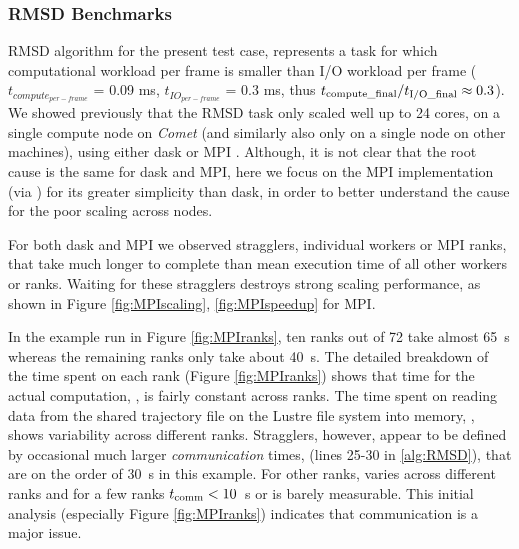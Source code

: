 \label{impl_exp}

\subsubsection{RMSD Benchmarks}
\label{sec:RMSD}
RMSD algorithm for the present test case, represents a task for which computational workload per frame is smaller than I/O workload per frame ($t_{compute_{per-frame}}$ = 0.09 ms, $t_{IO_{per-frame}}$ = 0.3 ms, thus ${t}_{\text{compute\_final}}/{t}_{\text{I/O\_final}} \approx 0.3$). 
We showed previously that the RMSD task only scaled well up to 24 cores, on a single compute node on \emph{Comet} (and similarly also only on a
single node on other machines), using either dask or MPI \cite{Khoshlessan:2017ab}. 
Although, it is not clear that the root cause is the same for dask and MPI, here we focus on the MPI
implementation (via  \cite{Dalcin:2011aa, Dalcin:2005aa}) for its greater simplicity than dask, in order to
better understand the cause for the poor scaling across nodes.

For both dask and MPI we observed stragglers, individual workers or
MPI ranks, that take much longer to complete than mean execution time of all other workers or ranks. 
Waiting for these stragglers destroys strong scaling performance, as shown in Figure \ref{fig:MPIscaling}, \ref{fig:MPIspeedup} for MPI. 

In the example run in Figure \ref{fig:MPIranks}, ten ranks out of 72 take almost 65~s whereas the
remaining ranks only take about 40~s. The detailed breakdown of the time spent on each rank (Figure \ref{fig:MPIranks}) shows that time
for the actual computation, \tcomp, is fairly constant across ranks. 
The time spent on reading data from the shared trajectory file on the Lustre file system into memory, \tIO, shows variability across different ranks. 
Stragglers, however, appear to be defined by occasional much larger \emph{communication} times, \tcomm (lines 25-30 in \ref{alg:RMSD}), that are on the order of 30~s in this example. 
For other ranks, \tcomm varies across different ranks and for a few ranks $t_{\text{comm}} < 10$~s or is barely measurable. 
This initial analysis (especially Figure \ref{fig:MPIranks}) indicates that communication is a major issue. 

